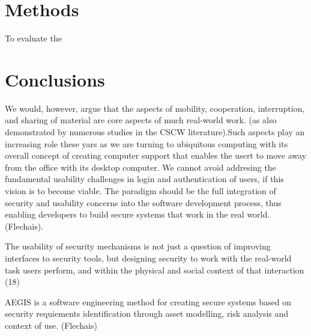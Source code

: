 \documentclass{article}
\begin{document}
\section{Methods}

To evaluate the 

\section{Conclusions}

We would, however, argue that the aspects of mobility, cooperation, interruption, and sharing of material are core aspects of much real-world work. (as also demonstrated by numerous studies in the CSCW literature).Such aspects play an increasing role these yars as we are turning to ubiquitous computing with its overall concept of creating computer support that enables the usert to move away from the office with its desktop computer. We cannot avoid addresing the fundamental usability challenges in login and authentication of users, if this vision is to become viable. 
The paradigm should be the full integration of security and usability concerns into the software development process, thus enabling developers to build secure systems that work in the real world. (Flechais). 

The usability of security mechanisms is not just a question of improving interfaces to security tools, but designing security to work with the real-world task users perform, and within the physical and social context of that interaction (18)

AEGIS is a software engineering method for creating secure systems based on security requiements identification through asset\cite{krumm} modelling, risk analysis and context of use. (Flechais) 



\end{document}
